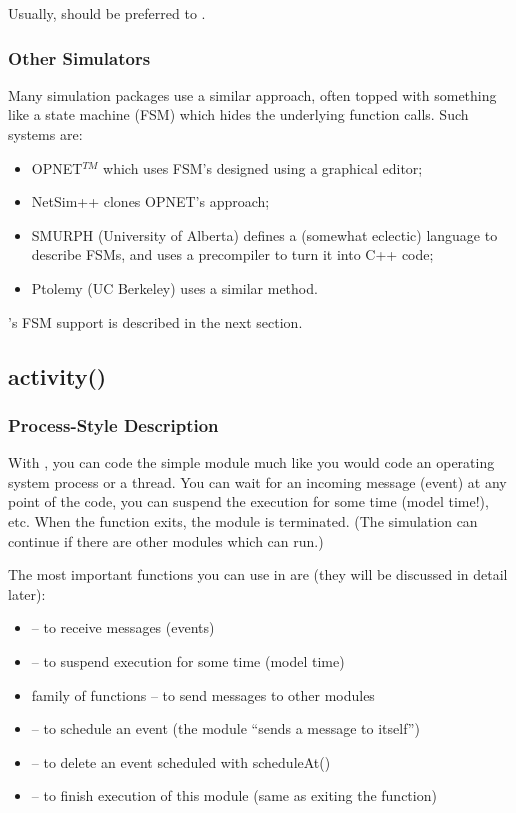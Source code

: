 Usually,  should be preferred to .


\subsubsection{Other Simulators}


Many simulation packages use a similar approach, often topped with
something like a state machine
(FSM) which hides the underlying function calls. Such
systems are:
\begin{itemize}
  \item{OPNET$^{TM}$ which uses FSM's designed using a graphical editor;}
  \item{NetSim++ clones OPNET's approach;}
  \item{SMURPH (University of Alberta) defines a (somewhat eclectic)
      language to describe FSMs, and uses a precompiler to turn it
      into C++ code;}
  \item{Ptolemy (UC Berkeley) uses a similar method.}
\end{itemize}

{\opp}'s FSM support is described in the next section.



\subsection{activity()}
\label{sec:simple-modules:activity}

\subsubsection{Process-Style Description}

With , you can code the simple
module much like you would code an operating system process or a
thread. You can wait for an incoming message (event) at any point of
the code, you can suspend the execution for some time (model time!),
etc. When the  function exits, the module is
terminated.  (The simulation can continue if there are other modules
which can run.)


The most important functions you can use in  are
(they will be discussed in detail later):
\begin{itemize}
\item{ -- to receive messages (events)}
\item{ -- to suspend execution
    for some time (model time)}
\item{ family of functions -- to send messages to other
    modules}
\item{ -- to schedule an event (the module ``sends
    a message to itself'')}
\item{ -- to delete an event scheduled with
    scheduleAt()}
\item{ -- to finish execution of this module (same as
    exiting the  function)}
\end{itemize}

